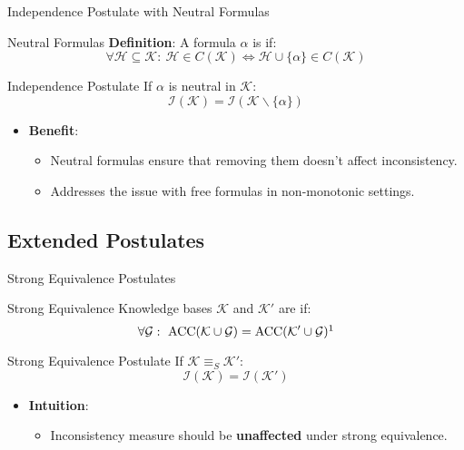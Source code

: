 \begin{frame}{Independence Postulate with Neutral Formulas}
    \begin{block}{Neutral Formulas}
        \textbf{Definition}: A formula \( \alpha \) is  if:
        \[
            \forall \mathcal{H} \subseteq \mathcal{K}:\ \mathcal{H} \in C(\mathcal{K}) \Leftrightarrow \mathcal{H} \cup \{\alpha\} \in C(\mathcal{K})
        \]
    \end{block}
    \begin{block}{Independence Postulate}
        If \( \alpha \) is neutral in \( \mathcal{K} \):
        \[
            \mathcal{I}(\mathcal{K}) = \mathcal{I}(\mathcal{K} \backslash \{\alpha\})
        \]
    \end{block}
    \begin{itemize}
        \item \textbf{Benefit}:
              \begin{itemize}
                  \item Neutral formulas ensure that removing them doesn't affect inconsistency.
                  \item Addresses the issue with free formulas in non-monotonic settings.
              \end{itemize}
    \end{itemize}
\end{frame}

\subsection{Extended Postulates}

\begin{frame}{Strong Equivalence Postulates}
    \begin{block}{Strong Equivalence}
        Knowledge bases \( \mathcal{K} \) and \( \mathcal{K}' \) are  if:
        \[
            \forall \mathcal{G}:\ \text{ACC}(\mathcal{K} \cup \mathcal{G}) = \text{ACC}(\mathcal{K}' \cup \mathcal{G})\footnotemark[1]
        \]
    \end{block}
    \begin{block}{Strong Equivalence Postulate}
        If \( \mathcal{K} \equiv_S \mathcal{K}' \):
        \[
            \mathcal{I}(\mathcal{K}) = \mathcal{I}(\mathcal{K}')
        \]
    \end{block}
    \begin{itemize}
        \item \textbf{Intuition}:
              \begin{itemize}
                  \item Inconsistency measure should be \textbf{unaffected} under strong equivalence.
              \end{itemize}
    \end{itemize}
\end{frame}

